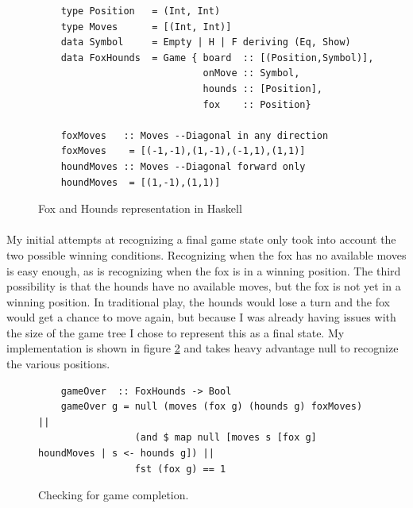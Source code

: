 \documentclass[10pt]{article}
\begin{document}
    \begin{figure}[ht]
        \centering
        \begin{verbatim}
    type Position   = (Int, Int)
    type Moves      = [(Int, Int)]
    data Symbol     = Empty | H | F deriving (Eq, Show)
    data FoxHounds  = Game { board  :: [(Position,Symbol)],
                             onMove :: Symbol,
                             hounds :: [Position],
                             fox    :: Position}

    foxMoves   :: Moves --Diagonal in any direction
    foxMoves    = [(-1,-1),(1,-1),(-1,1),(1,1)]
    houndMoves :: Moves --Diagonal forward only
    houndMoves  = [(1,-1),(1,1)]        \end{verbatim}
        \caption{Fox and Hounds representation in Haskell} \label{haskhhgame}
    \end{figure}

    \paragraph{} My initial attempts at recognizing a final game state only took into
    account the two possible winning conditions.  Recognizing when the fox has no 
    available moves is easy enough, as is recognizing when the fox is in a winning
    position.  The third possibility is that the hounds have no available moves, but
    the fox is not yet in a winning position.  In traditional play, the hounds would 
    lose a turn and the fox would get a chance to move again, but because I was already
    having issues with the size of the game tree I chose to represent this as a final
    state.  My implementation is shown in figure \ref{hhover} and takes heavy advantage
    null to recognize the various positions.

    \begin{figure}[ht]
        \centering
        \begin{verbatim}
    gameOver  :: FoxHounds -> Bool
    gameOver g = null (moves (fox g) (hounds g) foxMoves) || 
                 (and $ map null [moves s [fox g] houndMoves | s <- hounds g]) ||
                 fst (fox g) == 1        \end{verbatim}
        \caption{Checking for game completion.} \label{hhover}
    \end{figure}
\end{document}
